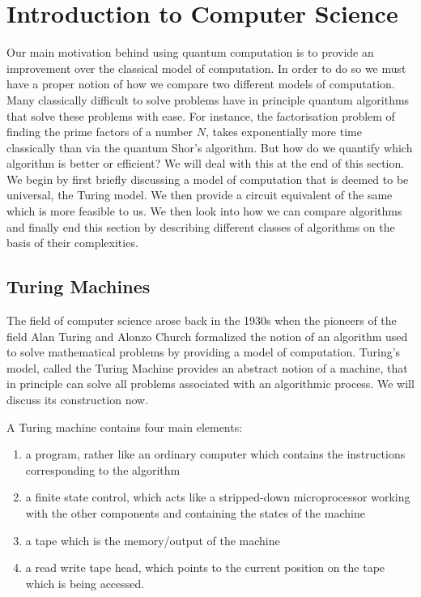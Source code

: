 \chapter{Introduction to Computer Science}
Our main motivation behind using quantum computation is to provide an improvement over the classical model of computation. In order to do so we must have a proper notion of how we compare two different models of computation. Many classically difficult to solve problems have in principle quantum algorithms that solve these problems with ease. For instance, the factorisation problem of finding the prime factors of a number $N$, takes exponentially more time classically than via the quantum Shor's algorithm. But how do we quantify which algorithm is better or efficient? We will deal with this at the end of this section. We begin by first briefly discussing a model of computation that is deemed to be universal, the Turing model. We then provide a circuit equivalent of the same which is more feasible to us. We then look into how we can compare algorithms and finally end this section by describing different classes of algorithms on the basis of their complexities.

\section{Turing Machines}
The field of computer science arose back in the 1930s when the pioneers of the field Alan Turing and Alonzo Church formalized the notion of an algorithm used to solve mathematical problems by providing a model of computation. Turing's model, called the Turing Machine provides an abstract notion of a machine, that in principle can solve all problems associated with an algorithmic process. We will discuss its construction now.

A Turing machine contains four main elements:
\begin{enumerate}
    \item a program, rather like an ordinary computer which contains the instructions corresponding to the algorithm
    \item a finite state control, which acts like a stripped-down microprocessor working with the other components and containing the states of the machine
    \item a tape which is the memory/output of the machine
    \item a read write tape head, which points to the current position on the tape which is being accessed.
\end{enumerate}

